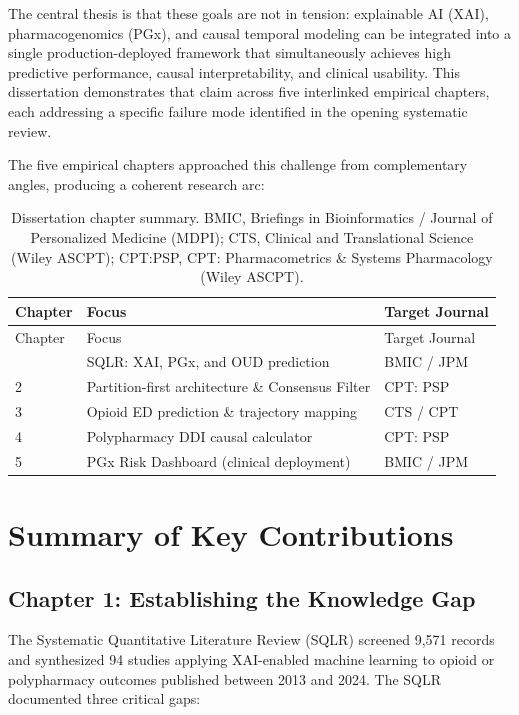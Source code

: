 \documentclass[
  12pt,
]{book}
\begin{document}
The central thesis is that these goals are not in tension: explainable
AI (XAI), pharmacogenomics (PGx), and causal temporal modeling can be
integrated into a single production-deployed framework that
simultaneously achieves high predictive performance, causal
interpretability, and clinical usability. This dissertation demonstrates
that claim across five interlinked empirical chapters, each addressing a
specific failure mode identified in the opening systematic review.

The five empirical chapters approached this challenge from complementary
angles, producing a coherent research arc:

\begin{longtable}[]{@{}lll@{}}
\caption{Dissertation chapter summary. BMIC, Briefings in Bioinformatics
/ Journal of Personalized Medicine (MDPI); CTS, Clinical and
Translational Science (Wiley ASCPT); CPT:PSP, CPT: Pharmacometrics \&
Systems Pharmacology (Wiley
ASCPT).}\label{tbl-chapter-summary}\tabularnewline
\toprule\noalign{}
Chapter & Focus & Target Journal \\
\midrule\noalign{}
\endfirsthead
\toprule\noalign{}
Chapter & Focus & Target Journal \\
\midrule\noalign{}
\endhead
\bottomrule\noalign{}
\endlastfoot
1 & SQLR: XAI, PGx, and OUD prediction & BMIC / JPM \\
2 & Partition-first architecture \& Consensus Filter & CPT: PSP \\
3 & Opioid ED prediction \& trajectory mapping & CTS / CPT \\
4 & Polypharmacy DDI causal calculator & CPT: PSP \\
5 & PGx Risk Dashboard (clinical deployment) & BMIC / JPM \\
\end{longtable}

\chapter{Summary of Key Contributions}\label{sec-contributions}

\section{Chapter 1: Establishing the Knowledge
Gap}\label{chapter-1-establishing-the-knowledge-gap}

The Systematic Quantitative Literature Review (SQLR) screened 9,571
records and synthesized 94 studies applying XAI-enabled machine learning
to opioid or polypharmacy outcomes published between 2013 and 2024. The
SQLR documented three critical gaps:
\end{document}
